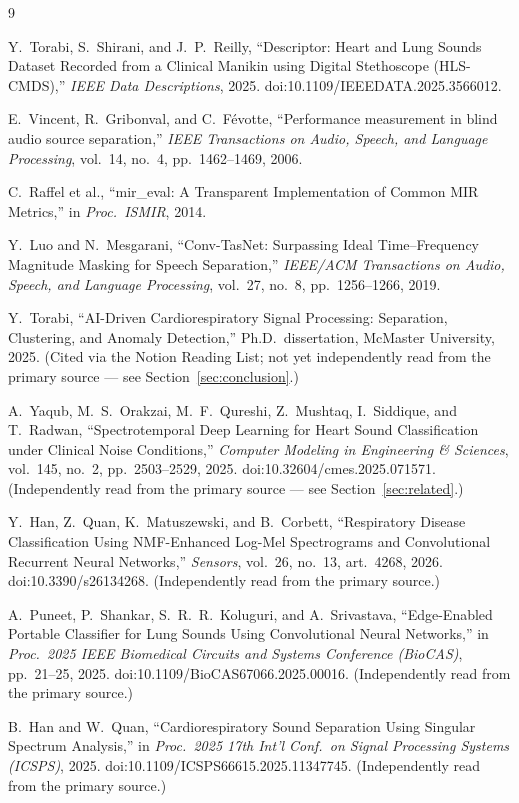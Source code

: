\documentclass[11pt]{article}
\begin{document}
\begin{thebibliography}{9}

Y.~Torabi, S.~Shirani, and J.~P.~Reilly, ``Descriptor: Heart and Lung Sounds
Dataset Recorded from a Clinical Manikin using Digital Stethoscope
(HLS-CMDS),'' \textit{IEEE Data Descriptions}, 2025.
doi:10.1109/IEEEDATA.2025.3566012.

E.~Vincent, R.~Gribonval, and C.~F\'{e}votte, ``Performance measurement in
blind audio source separation,'' \textit{IEEE Transactions on Audio,
Speech, and Language Processing}, vol.~14, no.~4, pp.~1462--1469, 2006.

C.~Raffel et al., ``mir\_eval: A Transparent Implementation of Common MIR
Metrics,'' in \textit{Proc.\ ISMIR}, 2014.

Y.~Luo and N.~Mesgarani, ``Conv-TasNet: Surpassing Ideal Time--Frequency
Magnitude Masking for Speech Separation,'' \textit{IEEE/ACM Transactions on
Audio, Speech, and Language Processing}, vol.~27, no.~8, pp.~1256--1266,
2019.

Y.~Torabi, ``AI-Driven Cardiorespiratory Signal Processing: Separation,
Clustering, and Anomaly Detection,'' Ph.D.\ dissertation, McMaster
University, 2025. (Cited via the Notion Reading List; not yet
independently read from the primary source --- see
Section~\ref{sec:conclusion}.)

A.~Yaqub, M.~S.~Orakzai, M.~F.~Qureshi, Z.~Mushtaq, I.~Siddique, and
T.~Radwan, ``Spectrotemporal Deep Learning for Heart Sound Classification
under Clinical Noise Conditions,'' \textit{Computer Modeling in
Engineering \& Sciences}, vol.~145, no.~2, pp.~2503--2529, 2025.
doi:10.32604/cmes.2025.071571. (Independently read from the primary
source --- see Section~\ref{sec:related}.)

Y.~Han, Z.~Quan, K.~Matuszewski, and B.~Corbett, ``Respiratory Disease
Classification Using NMF-Enhanced Log-Mel Spectrograms and Convolutional
Recurrent Neural Networks,'' \textit{Sensors}, vol.~26, no.~13, art.~4268,
2026. doi:10.3390/s26134268. (Independently read from the primary source.)

A.~Puneet, P.~Shankar, S.~R.~R.~Koluguri, and A.~Srivastava,
``Edge-Enabled Portable Classifier for Lung Sounds Using Convolutional
Neural Networks,'' in \textit{Proc.\ 2025 IEEE Biomedical Circuits and
Systems Conference (BioCAS)}, pp.~21--25, 2025.
doi:10.1109/BioCAS67066.2025.00016. (Independently read from the primary
source.)

B.~Han and W.~Quan, ``Cardiorespiratory Sound Separation Using Singular
Spectrum Analysis,'' in \textit{Proc.\ 2025 17th Int'l Conf.\ on Signal
Processing Systems (ICSPS)}, 2025. doi:10.1109/ICSPS66615.2025.11347745.
(Independently read from the primary source.)

\end{thebibliography}
\end{document}
